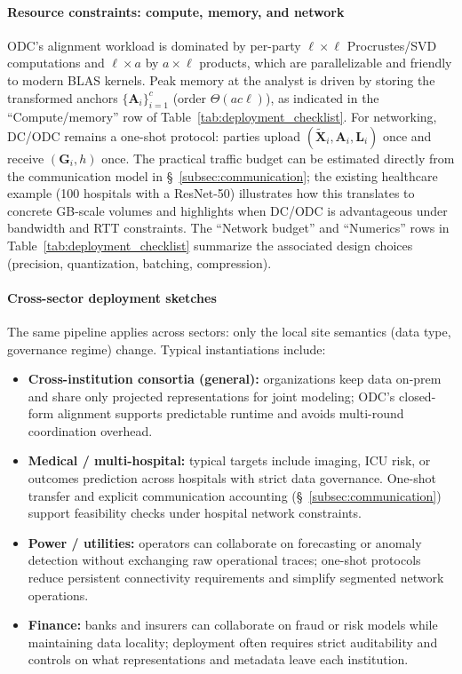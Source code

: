 \documentclass[final,3p,times]{elsarticle}
\theoremstyle{plain}
\newcommand{\matr}[1]{\bm{#1}}        %
\begin{document}
\paragraph{Resource constraints: compute, memory, and network}
ODC’s alignment workload is dominated by per-party $\ell\times\ell$ Procrustes/SVD computations and $\ell\times a$ by $a\times \ell$ products, which are parallelizable and friendly to modern BLAS kernels. Peak memory at the analyst is driven by storing the transformed anchors $\{\matr{A}_i\}_{i=1}^c$ (order $\Theta(ac\ell)$), as indicated in the “Compute/memory” row of Table~\ref{tab:deployment_checklist}. For networking, DC/ODC remains a one-shot protocol: parties upload $(\tilde{\matr{X}}_i,\matr{A}_i,\matr{L}_i)$ once and receive $(\matr{G}_i,h)$ once. The practical traffic budget can be estimated directly from the communication model in \S~\ref{subsec:communication}; the existing healthcare example (100 hospitals with a ResNet-50) illustrates how this translates to concrete GB-scale volumes and highlights when DC/ODC is advantageous under bandwidth and RTT constraints. The “Network budget” and “Numerics” rows in Table~\ref{tab:deployment_checklist} summarize the associated design choices (precision, quantization, batching, compression).

\paragraph{Cross-sector deployment sketches}
The same pipeline applies across sectors: only the local site semantics (data type, governance regime) change. Typical instantiations include:
\begin{itemize}
  \item \textbf{Cross-institution consortia (general):} organizations keep data on-prem and share only projected representations for joint modeling; ODC’s closed-form alignment supports predictable runtime and avoids multi-round coordination overhead.
  \item \textbf{Medical / multi-hospital:} typical targets include imaging, ICU risk, or outcomes prediction across hospitals with strict data governance. One-shot transfer and explicit communication accounting (\S~\ref{subsec:communication}) support feasibility checks under hospital network constraints.
  \item \textbf{Power / utilities:} operators can collaborate on forecasting or anomaly detection without exchanging raw operational traces; one-shot protocols reduce persistent connectivity requirements and simplify segmented network operations.
  \item \textbf{Finance:} banks and insurers can collaborate on fraud or risk models while maintaining data locality; deployment often requires strict auditability and controls on what representations and metadata leave each institution.
\end{itemize}
\end{document}
